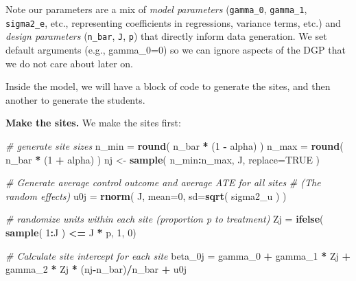 \documentclass[
]{book}
\newenvironment{Shaded}{\begin{snugshade}}{\end{snugshade}}
\newcommand{\AttributeTok}[1]{\textcolor[rgb]{0.13,0.29,0.53}{#1}}
\newcommand{\CommentTok}[1]{\textcolor[rgb]{0.56,0.35,0.01}{\textit{#1}}}
\newcommand{\ConstantTok}[1]{\textcolor[rgb]{0.56,0.35,0.01}{#1}}
\newcommand{\DecValTok}[1]{\textcolor[rgb]{0.00,0.00,0.81}{#1}}
\newcommand{\FunctionTok}[1]{\textcolor[rgb]{0.13,0.29,0.53}{\textbf{#1}}}
\newcommand{\NormalTok}[1]{#1}
\newcommand{\OtherTok}[1]{\textcolor[rgb]{0.56,0.35,0.01}{#1}}
\newcommand{\SpecialCharTok}[1]{\textcolor[rgb]{0.81,0.36,0.00}{\textbf{#1}}}
\begin{document}
Note our parameters are a mix of \emph{model parameters} (\texttt{gamma\_0}, \texttt{gamma\_1}, \texttt{sigma2\_e}, etc., representing coefficients in regressions, variance terms, etc.) and \emph{design parameters} (\texttt{n\_bar}, \texttt{J}, \texttt{p}) that directly inform data generation.
We set default arguments (e.g., gamma\_0=0) so we can ignore aspects of the DGP that we do not care about later on.

Inside the model, we will have a block of code to generate the sites, and then another to generate the students.

\textbf{Make the sites.}
We make the sites first:

\begin{Shaded}
\begin{Highlighting}[]
  \CommentTok{\# generate site sizes }
\NormalTok{  n\_min }\OtherTok{=} \FunctionTok{round}\NormalTok{( n\_bar }\SpecialCharTok{*}\NormalTok{ (}\DecValTok{1} \SpecialCharTok{{-}}\NormalTok{ alpha) )}
\NormalTok{  n\_max }\OtherTok{=} \FunctionTok{round}\NormalTok{( n\_bar }\SpecialCharTok{*}\NormalTok{ (}\DecValTok{1} \SpecialCharTok{+}\NormalTok{ alpha) )}
\NormalTok{  nj }\OtherTok{\textless{}{-}} \FunctionTok{sample}\NormalTok{( n\_min}\SpecialCharTok{:}\NormalTok{n\_max, J, }\AttributeTok{replace=}\ConstantTok{TRUE}\NormalTok{ )}

  \CommentTok{\# Generate average control outcome and average ATE for all sites}
  \CommentTok{\# (The random effects)}
\NormalTok{  u0j }\OtherTok{=} \FunctionTok{rnorm}\NormalTok{( J, }\AttributeTok{mean=}\DecValTok{0}\NormalTok{, }\AttributeTok{sd=}\FunctionTok{sqrt}\NormalTok{( sigma2\_u ) )}
  
  \CommentTok{\# randomize units within each site (proportion p to treatment)}
\NormalTok{  Zj }\OtherTok{=} \FunctionTok{ifelse}\NormalTok{( }\FunctionTok{sample}\NormalTok{( }\DecValTok{1}\SpecialCharTok{:}\NormalTok{J ) }\SpecialCharTok{\textless{}=}\NormalTok{ J }\SpecialCharTok{*}\NormalTok{ p, }\DecValTok{1}\NormalTok{, }\DecValTok{0}\NormalTok{)}
  
  \CommentTok{\# Calculate site intercept for each site}
\NormalTok{  beta\_0j }\OtherTok{=}\NormalTok{ gamma\_0 }\SpecialCharTok{+}\NormalTok{ gamma\_1 }\SpecialCharTok{*}\NormalTok{ Zj }\SpecialCharTok{+}\NormalTok{ gamma\_2 }\SpecialCharTok{*}\NormalTok{ Zj }\SpecialCharTok{*}\NormalTok{ (nj}\SpecialCharTok{{-}}\NormalTok{n\_bar)}\SpecialCharTok{/}\NormalTok{n\_bar }\SpecialCharTok{+}\NormalTok{ u0j}
\end{Highlighting}
\end{Shaded}
\end{document}
